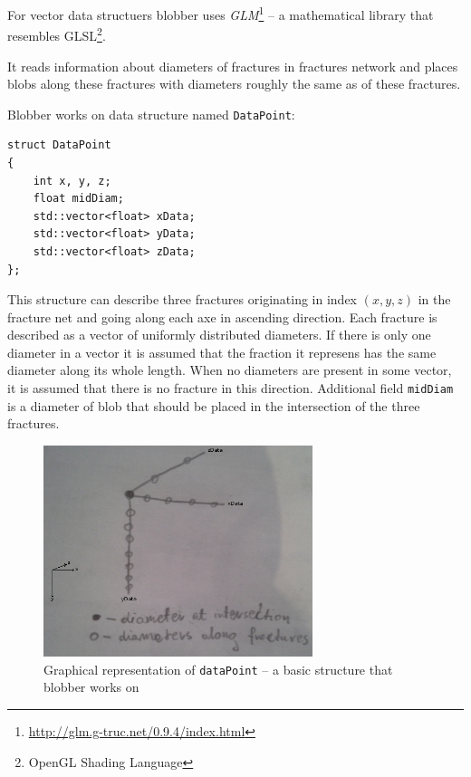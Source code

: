 For vector data structuers blobber uses \emph{GLM}\footnote{\url{http://glm.g-truc.net/0.9.4/index.html}}
-- a mathematical library that resembles GLSL\footnote{OpenGL Shading Language}.

It reads information about diameters of fractures in fractures network
and places blobs along these fractures with diameters roughly the same as of
these fractures.

Blobber works on data structure named \texttt{DataPoint}:

\begin{lstlisting}
struct DataPoint
{
  	int x, y, z;
	float midDiam;
	std::vector<float> xData;
	std::vector<float> yData;
	std::vector<float> zData;
};
\end{lstlisting}

This structure can describe three fractures originating in index $(x,y,z)$ in
the fracture net and going along each axe in ascending direction. Each fracture
is described as a vector of uniformly distributed diameters. If there is only
one diameter in a vector it is assumed that the fraction it represens has the
same diameter along its whole length. When no diameters are present in some
vector, it is assumed that there is no fracture in this direction.
Additional field \texttt{midDiam} is a diameter of blob that should be placed in
the intersection of the three fractures.

\begin{figure}[hb]
  \begin{center}
    \includegraphics[width=0.7\textwidth]{chapters/project/datapoint.jpg}
  \end{center}
  \caption{Graphical representation of \texttt{dataPoint} -- a basic structure that
blobber works on}
  \label{fig:datapoint}
\end{figure}

